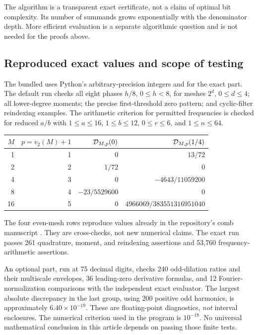 \documentclass[11pt,a4paper]{article}
\numberwithin{equation}{section}
\theoremstyle{definition}
\theoremstyle{remark}
\begin{document}
The algorithm is a transparent exact certificate, not a claim of optimal
bit complexity. Its number of summands grows exponentially with the
denominator depth. More efficient evaluation is a separate algorithmic
question and is not needed for the proofs above.

\subsection{Reproduced exact values and scope of testing}

The bundled  uses Python's arbitrary-precision integers
and  for the exact part. The default run checks
all eight phases $h/8$, $0\le h<8$, for meshes $2^d$, $0\le d\le4$;
all lower-degree moments; the precise first-threshold zero pattern;
and cyclic-filter reindexing examples. The arithmetic criterion for
permitted frequencies is checked for reduced $a/b$ with
$1\le a\le16$, $1\le b\le12$, $0\le r\le6$, and $1\le n\le64$.

\begin{center}
\begin{tabular}{rrrr}
\toprule
$M$ & $p=v_2(M)+1$ & $\mathcal D_{M,p}(0)$ & $\mathcal D_{M,p}(1/4)$\\
\midrule
1&1&0&$13/72$\\[2pt]
2&2&$1/72$&0\\[2pt]
4&3&0&$-4643/11059200$\\[2pt]
8&4&$-23/5529600$&0\\[2pt]
16&5&0&$4966069/383551316951040$\\
\bottomrule
\end{tabular}
\end{center}
The four even-mesh rows reproduce values already in the repository's
comb manuscript \cite{repoComb}. They are cross-checks, not new numerical
claims. The exact run passes 261 quadrature, moment, and reindexing
assertions and 53,760 frequency-arithmetic assertions.

An optional  part, run at 75 decimal digits, checks 240
odd-dilation ratios and their multiscale envelopes, 36 leading-zero
derivative formulas, and 12
Fourier-normalization comparisons with the independent exact evaluator.
The largest absolute discrepancy in the last group, using 200 positive
odd harmonics, is approximately $6.40\times10^{-19}$. These are
floating-point diagnostics, \emph{not} interval enclosures. The numerical
criterion used in the program is $10^{-18}$. No universal mathematical
conclusion in this article depends on passing those finite tests.
\end{document}
